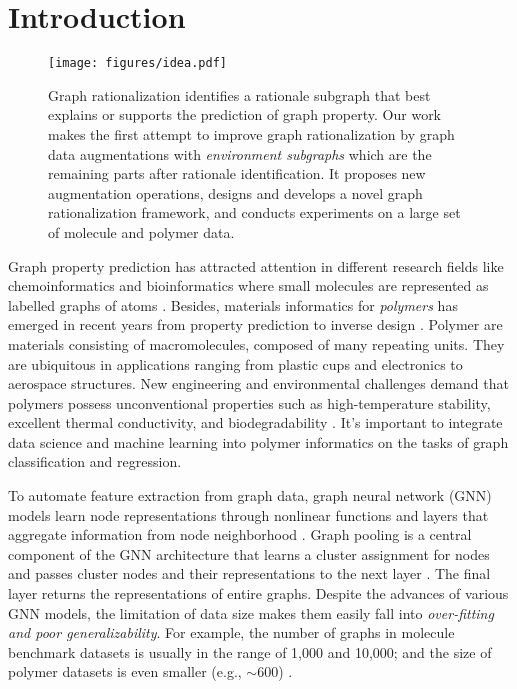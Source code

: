 \documentclass[sigconf]{acmart}
\begin{document}

\maketitle

\section{Introduction}
\label{sec:introduction}
\begin{figure*}[t]
    \centering
    \texttt{[image: figures/idea.pdf]}
    \vspace{-0.2in}
    \caption{Graph rationalization identifies a rationale subgraph that best explains or supports the prediction of graph property. Our work makes the first attempt to improve graph rationalization by graph data augmentations with \emph{environment subgraphs} which are the remaining parts after rationale identification. It proposes new augmentation operations, designs and develops a novel graph rationalization framework, and conducts experiments on a large set of molecule and polymer data.}
    \label{fig:idea}
    \vspace{-0.1in}
\end{figure*}

Graph property prediction has attracted attention in different research fields like chemoinformatics and bioinformatics where small molecules are represented as labelled graphs of atoms \cite{hu2020open,zhou2020data,guo2021few}.
Besides, materials informatics for \emph{polymers} has emerged in recent years from property prediction to inverse design \cite{kim2018polymer,chen2021polymer}.
Polymer are materials consisting of macromolecules, composed of many repeating units. They are ubiquitous in applications ranging from plastic cups and electronics to aerospace structures.
New engineering and environmental challenges demand that polymers possess unconventional properties such as high-temperature stability, excellent thermal conductivity, and biodegradability \cite{ma2019evaluating,wei2021thermal}.
It's important to integrate data science and machine learning into polymer informatics on the tasks of graph classification and regression.

To automate feature extraction from graph data, graph neural network (GNN) models learn node representations through nonlinear functions and layers that aggregate information from node neighborhood \cite{kipf2017semi,velivckovic2018graph,hamilton2017inductive,zhang2020deep,wu2020comprehensive}. Graph pooling is a central component of the GNN architecture that learns a cluster assignment for nodes and passes cluster nodes and their representations to the next layer \cite{ying2018hierarchical,lee2019self}. The final layer returns the representations of entire graphs. Despite the advances of various GNN models, the limitation of data size makes them easily fall into \emph{over-fitting and poor generalizability}. For example, the number of graphs in molecule benchmark datasets is usually in the range of 1,000 and 10,000; and the size of polymer datasets is even smaller (e.g., $\sim$600) \cite{ma2020pi1m}.
\end{document}
